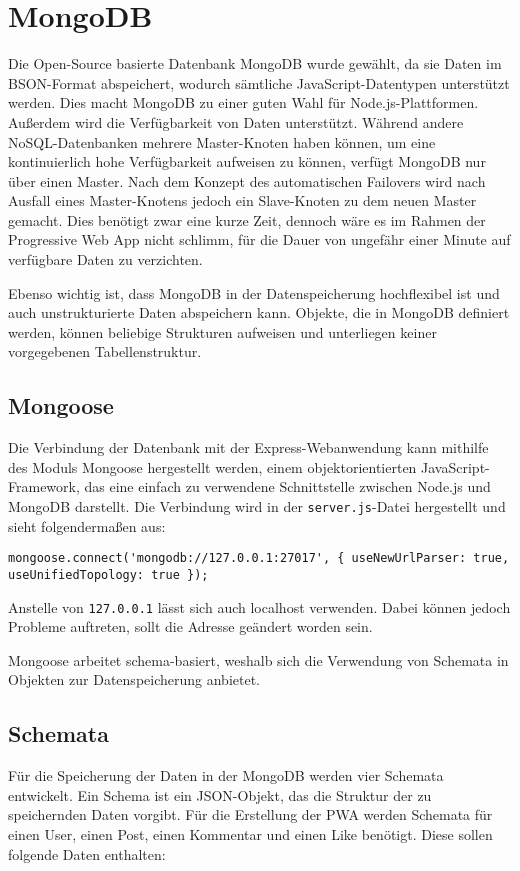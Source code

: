 \chapter{MongoDB}

Die Open-Source basierte Datenbank MongoDB wurde gewählt, da sie Daten im BSON-Format abspeichert, wodurch sämtliche JavaScript-Datentypen unterstützt werden. Dies macht MongoDB zu einer guten Wahl für Node.js-Plattformen. Außerdem wird die Verfügbarkeit von Daten unterstützt. Während andere NoSQL-Datenbanken mehrere Master-Knoten haben können, um eine kontinuierlich hohe Verfügbarkeit aufweisen zu können, verfügt MongoDB nur über einen Master. Nach dem Konzept des automatischen Failovers wird nach Ausfall eines Master-Knotens jedoch ein Slave-Knoten zu dem neuen Master gemacht. Dies benötigt zwar eine kurze Zeit, dennoch wäre es im Rahmen der Progressive Web App nicht schlimm, für die Dauer von ungefähr einer Minute auf verfügbare Daten zu verzichten. 

Ebenso wichtig ist, dass MongoDB in der Datenspeicherung hochflexibel ist und auch unstrukturierte Daten abspeichern kann. Objekte, die in MongoDB definiert werden, können beliebige Strukturen aufweisen und unterliegen keiner vorgegebenen Tabellenstruktur.

\section{Mongoose}
Die Verbindung der Datenbank mit der Express-Webanwendung kann mithilfe des Moduls Mongoose hergestellt werden, einem objektorientierten JavaScript-Framework, das eine einfach zu verwendene Schnittstelle zwischen Node.js und MongoDB darstellt. Die Verbindung wird in der \texttt{server.js}-Datei hergestellt und sieht folgendermaßen aus:

\begin{lstlisting}[caption=Herstellen der Verbindung zu MongoDB, label=lst:url]
    mongoose.connect('mongodb://127.0.0.1:27017', { useNewUrlParser: true, useUnifiedTopology: true });
\end{lstlisting}

Anstelle von \texttt{127.0.0.1} lässt sich auch {localhost} verwenden. Dabei können jedoch Probleme auftreten, sollt die Adresse geändert worden sein.

Mongoose arbeitet schema-basiert, weshalb sich die Verwendung von Schemata in Objekten zur Datenspeicherung anbietet.

\section{Schemata}
Für die Speicherung der Daten in der MongoDB werden vier Schemata entwickelt. Ein Schema ist ein JSON-Objekt, das die Struktur der zu speichernden Daten vorgibt. Für die Erstellung der PWA werden Schemata für einen User, einen Post, einen Kommentar und einen Like benötigt. Diese sollen folgende Daten enthalten:


